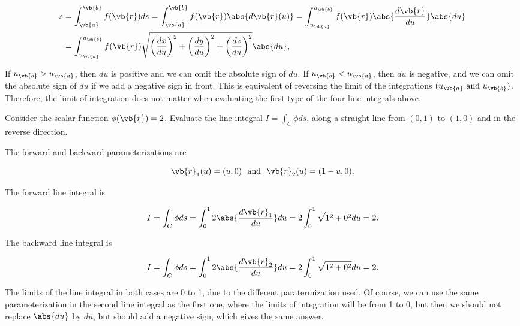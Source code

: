 \documentclass[english,a4paper,12pt]{report}
\begin{document}
\begin{equation}
	\begin{aligned} 
	s &= \int_{\vb{a} }^{\vb{b} }f(\vb{r} )ds = \int_{\vb{a} }^{\vb{b} } f(\vb{r} )\abs{d \vb{r} (u)} = \int_{u_{\vb{a} } }^{u_{\vb{b} }  } f(\vb{r} )\abs{\frac{d\vb{r} }{du} } \abs{du}  \\
	&= \int_{u_{ \vb{a}} }^{u_{ \vb{b}} }f(\vb{r} ) \sqrt{\left( \frac{dx}{du}\right)^2 + \left( \frac{dy}{du}  \right)^2 + \left( \frac{dz}{du}  \right)^2} \abs{du},\\
	\end{aligned} 
\end{equation}

If \(u_{\vb{b} } > u_{\vb{a} }  \), then \(du\) is positive and we can omit the absolute sign of \(du\). If \(u_{\vb{b} } < u_{\vb{a} }  \), then \(du\) is negative, and we can omit the absolute sign of \(du\) if we add a negative sign in front. This is equivalent of reversing the limit of the integrations \((u_{\vb{a} } \text { and } u_{\vb{b} }  )\). Therefore, the limit of integration does not matter when evaluating the first type of the four line integrals above. 

{Consider the scalar function \(\phi (\vb{r} ) = 2\). Evaluate the line integral \(I = \int_{C}^{} \phi ds \), along a straight line from \((0,1)\) to \((1,0)\) and in the reverse direction.}
{The forward and backward parameterizations are

\begin{equation}
	\vb{r}_{1}  (u) = (u,0) ~\text { and }~ \vb{r}_{2} (u) = (1-u,0).
\end{equation}

The forward line integral is 

\begin{equation}
	I = \int_{C}^{} \phi ds = \int_{0}^{1} 2 \abs{\frac{d\vb{r} _{1} }{du} } du = 2 \int_{0}^{1} \sqrt{1^2 + 0^2} du = 2.     
\end{equation}

The backward line integral is 

\begin{equation}
	I = \int_{C}^{} \phi ds = \int_{0}^{1} 2 \abs{\frac{d\vb{r} _{2} }{du} } du = 2 \int_{0}^{1} \sqrt{1^2 + 0^2} du = 2.     
\end{equation}

The limits of the line integral in both cases are 0 to 1, due to the different paratermization used. Of course, we can use the same parameterization in the second line integral as the first one, where the limits of integration will be from 1 to 0, but then we should not replace \(\abs{du} \) by \(du\), but should add a negative sign, which gives the same answer.  
} 
\end{document}

